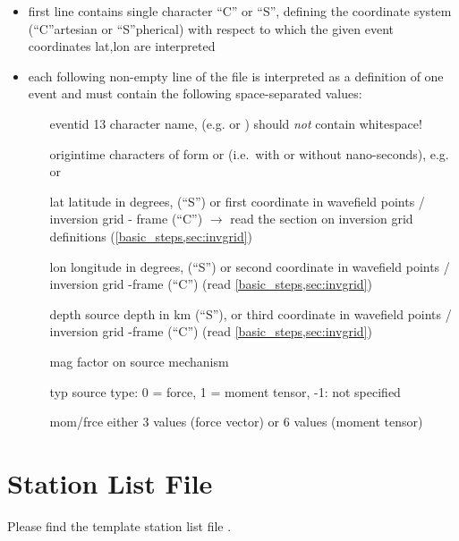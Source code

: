 \begin{itemize}
\item first line contains single character ``C'' or ``S'', defining the coordinate system (``C''artesian or ``S''pherical)
  with respect to which the given event coordinates lat,lon are interpreted
\item each following non-empty line of the file is interpreted as a definition of one event and must 
  contain the following space-separated values:
  \begin{itemize}
  \item[eventid]  13 character name, (e.g.  or ) 
    should \emph{not} contain whitespace!
  \item[origintime]  characters of form  or 
    (i.e.\ with or without nano-seconds), e.g.  or 
  \item[lat] latitude in degrees,  (``S'') or first coordinate in 
    wavefield points / inversion grid - frame (``C'') $\rightarrow$  read the section on inversion grid definitions 
    (\ref{basic_steps,sec:invgrid})
  \item[lon] longitude in degrees,  (``S'') or second  coordinate in 
    wavefield points / inversion grid -frame (``C'') (read \ref{basic_steps,sec:invgrid})
  \item[depth] source depth in km (``S''), or third coordinate in wavefield points / inversion grid -frame (``C'') 
    (read \ref{basic_steps,sec:invgrid})
  \item[mag] factor on source mechanism
  \item[typ] source type:  0 = force, 1 = moment tensor, -1: not specified
  \item[mom/frce] either 3 values (force vector) or 6 values (moment tensor)
  \end{itemize}
\end{itemize}
%
\section{Station List File} \label{files,sec:station_list}
%
Please find the template station list file .

